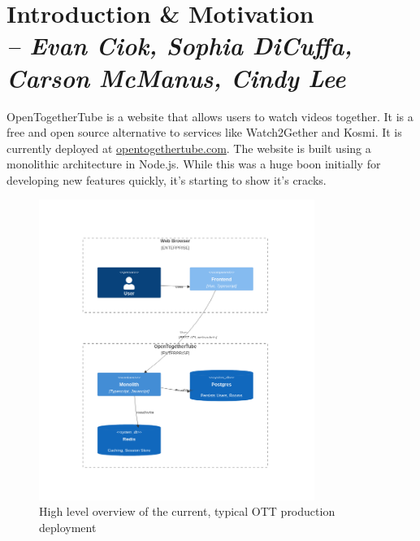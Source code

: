 \chapter{Introduction \& Motivation \\
  \small{\textit{-- Evan Ciok, Sophia DiCuffa, Carson McManus, Cindy Lee}}
  \label{Chapter::Motivation}}

OpenTogetherTube is a website that allows users to watch videos together. It is a free and open source alternative to services like Watch2Gether and Kosmi. It is currently deployed at \href{https://opentogethertube.com}{opentogethertube.com}. The website is built using a monolithic architecture in Node.js. While this was a huge boon initially for developing new features quickly, it's starting to show it's cracks.

\begin{figure}[!h]
  \centering
  \includegraphics[width=0.8\textwidth]{Figures/deployment-current.png}
  \caption{High level overview of the current, typical OTT production deployment}
  \label{Figure::deployment-current}
\end{figure}

